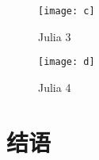 \documentclass{ctexart}
\begin{document}
\begin{figure}[H]
  \centering
  \begin{minipage}[t]{0.48\textwidth}
    \centering
    \texttt{[image: c]}
    \caption{Julia 3}
  \end{minipage}
  \begin{minipage}[t]{0.48\textwidth}
    \centering
    \texttt{[image: d]}
    \caption{Julia 4}
  \end{minipage}
\end{figure}

\section{结语}



\end{document}
